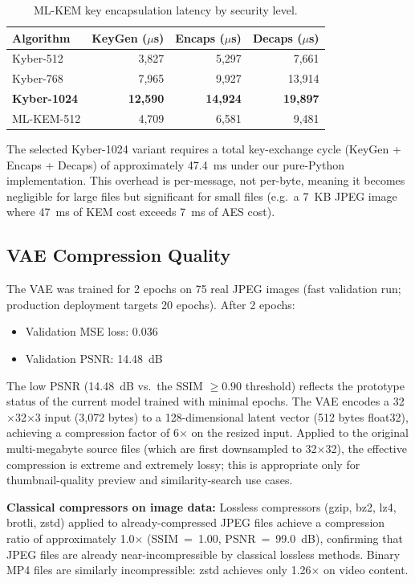 \documentclass[twocolumn]{article}
\begin{document}
\begin{table}[t]
\caption{ML-KEM key encapsulation latency by security level.}
\label{tab:kem}
\centering\small
\begin{tabular}{lrrr}
\toprule
Algorithm & KeyGen ($\mu$s) & Encaps ($\mu$s) & Decaps ($\mu$s) \\
\midrule
Kyber-512 & 3,827 & 5,297 & 7,661 \\
Kyber-768 & 7,965 & 9,927 & 13,914 \\
\textbf{Kyber-1024} & \textbf{12,590} & \textbf{14,924} & \textbf{19,897} \\
ML-KEM-512 & 4,709 & 6,581 & 9,481 \\
\bottomrule
\end{tabular}
\end{table}

The selected Kyber-1024 variant requires a total key-exchange cycle (KeyGen +
Encaps + Decaps) of approximately 47.4~ms under our pure-Python implementation.
This overhead is per-message, not per-byte, meaning it becomes negligible for
large files but significant for small files (e.g.\ a 7~KB JPEG image where
47~ms of KEM cost exceeds 7~ms of AES cost).

\subsection{VAE Compression Quality}

The VAE was trained for 2 epochs on 75 real JPEG images (fast validation run;
production deployment targets 20 epochs). After 2 epochs:
\begin{itemize}
  \item Validation MSE loss: 0.036
  \item Validation PSNR: 14.48~dB
\end{itemize}

The low PSNR (14.48~dB vs.\ the SSIM $\geq 0.90$ threshold) reflects the
prototype status of the current model trained with minimal epochs. The VAE
encodes a 32$\times$32$\times$3 input (3,072 bytes) to a 128-dimensional latent
vector (512 bytes float32), achieving a compression factor of 6$\times$ on the
resized input. Applied to the original multi-megabyte source files (which are
first downsampled to 32$\times$32), the effective compression is extreme and
extremely lossy; this is appropriate only for thumbnail-quality preview and
similarity-search use cases.

\textbf{Classical compressors on image data:} Lossless compressors (gzip, bz2,
lz4, brotli, zstd) applied to already-compressed JPEG files achieve a compression
ratio of approximately 1.0$\times$ (SSIM~=~1.00, PSNR~=~99.0~dB), confirming
that JPEG files are already near-incompressible by classical lossless methods.
Binary MP4 files are similarly incompressible: zstd achieves only 1.26$\times$
on video content.
\end{document}
